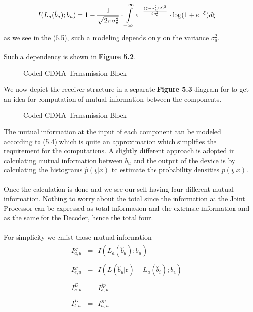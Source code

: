 \begin{equation}
I(L_a(\hat{b}_u);b_u)=1-\frac{\hbox{$1$}}{\hbox{$\sqrt{2\pi\sigma_a^2}$}}\cdot\int\limits_{-\infty}^{\infty}e^{-\frac{(\xi-\sigma_a^2/2)^2}{2\sigma_a^2}}\cdot \mathrm{log}(1+e^{-\xi})d\xi
\end{equation}
as we see in the (5.5), such a modeling depends only on the variance $\sigma_a^2$.\\ \\
Such a dependency is shown in \textbf{Figure 5.2}.
\begin{figure}[htb]
\centerline{  }
\caption{Coded CDMA Transmission Block}
\end{figure}
We now depict the receiver structure in a separate \textbf{Figure 5.3} diagram for to get an idea for computation of mutual information between the components. 
\begin{figure}[htb]
\centerline{  }
\caption{Coded CDMA Transmission Block}
\end{figure}
The mutual information at the input of each component can be modeled according to (5.4) which is quite an approximation which simplifies the requirement for the computations. A slightly different approach is adopted in calculating mutual information between $b_u$ and the output of the device is by calculating the histograms $\hat{p}(y\vert x)$ to estimate the probability densities $p(y\vert x)$.\\ \\
Once the calculation is done and we see our-self having four different mutual information. Nothing to worry about the total since the information at the Joint Processor can be expressed as total information and the extrinsic information and as the same for the Decoder, hence the total four. \\ \\
For simplicity we enlist those mutual information 
\begin{eqnarray*}
\begin{array}{lll}
I_{a,u}^{jp}&=&I(L_a(\hat{b}_u);b_u) \\ \\
I_{e,u}^{jp}&=&I(L(\hat{b}_u\vert \mathbf{\mathrm{r}})-L_a(\hat{b}_i);b_u) \\ \\
I_{a,u}^D&=&I_{e,u}^{jp} \\ \\
I_{t,u}^D&=&I_{a,u}^{jp} \\ \\
\end{array}
\end{eqnarray*}
